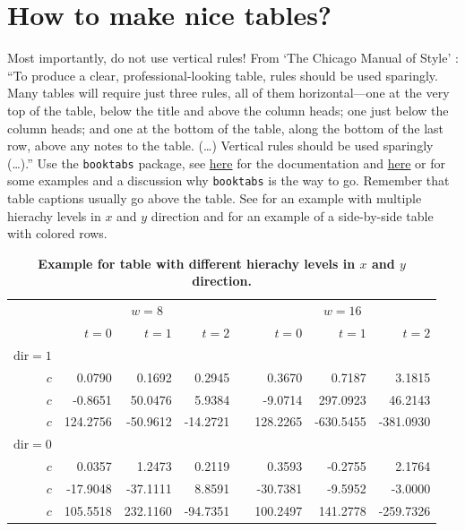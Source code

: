\section{How to make nice tables?}
Most importantly, do not use vertical rules!
From `The Chicago Manual of Style' \cite{chicagoMOS}: ``To produce a clear, professional-looking table, rules should be used sparingly. Many tables will require just three rules, all of them horizontal—one at the very top of the table, below the title and above the column heads; one just below the column heads; and one at the bottom of the table, along the bottom of the last row, above any notes to the table. (\ldots) Vertical rules should be used sparingly (\ldots).'' 
Use the \verb|booktabs| package, see  \href{https://ctan.org/pkg/booktabs}{here} for the documentation and \href{https://nhigham.com/2019/11/19/better-latex-tables-with-booktabs/}{here} or \href{}{} for some examples and a discussion why \verb|booktabs| is the way to go. Remember that table captions usually go above the table. See  for an example with multiple hierachy levels in $x$ and $y$ direction and  for an example of a side-by-side table with colored rows.

\begin{table}
	
	\centering
	\caption{\textbf{Example for table with different hierachy levels in $x$ and $y$ direction.} \blindtext}
	\label{tab:table1}
	\vspace{5ex}
	\begin{tabular}{@{}rrrrcrrr@{}}\toprule
		& \multicolumn{3}{c}{$w = 8$} & \phantom{abc}& \multicolumn{3}{c}{$w = 16$} \\
		\cmidrule{2-4} \cmidrule{6-8}
		& $t=0$ & $t=1$ & $t=2$ && $t=0$ & $t=1$ & $t=2$\\ 
		\midrule
		$\mathrm{dir}=1$\\
		$c$ & 0.0790 & 0.1692 & 0.2945 && 0.3670 & 0.7187 & 3.1815 \\
		$c$ & -0.8651& 50.0476& 5.9384&& -9.0714& 297.0923& 46.2143\\
		$c$ & 124.2756& -50.9612& -14.2721&& 128.2265& -630.5455& -381.0930\\
		$\mathrm{dir}=0$\\
		$c$ & 0.0357& 1.2473& 0.2119&& 0.3593& -0.2755& 2.1764\\
		$c$ & -17.9048& -37.1111& 8.8591&& -30.7381& -9.5952& -3.0000\\
		$c$ & 105.5518& 232.1160& -94.7351&& 100.2497& 141.2778& -259.7326\\
		\bottomrule
	\end{tabular}

\end{table}

